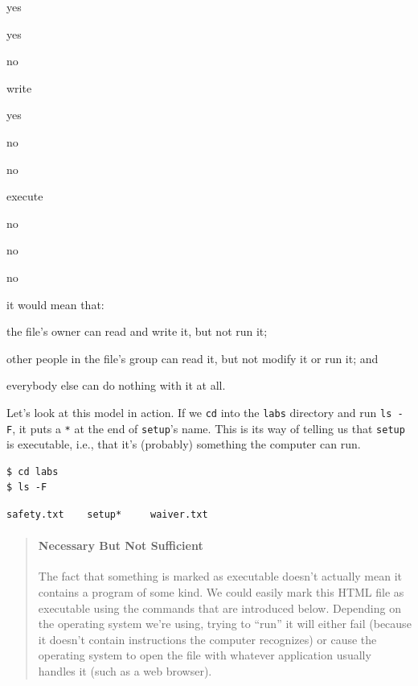 \documentclass{book}
\begin{document}
yes

yes

no

write

yes

no

no

execute

no

no

no

it would mean that:

\begin{swcitemize}
\item
  the file's owner can read and write it, but not run it;
\item
  other people in the file's group can read it, but not modify it or run
  it; and
\item
  everybody else can do nothing with it at all.
\end{swcitemize}

Let's look at this model in action. If we \texttt{cd} into the
\texttt{labs} directory and run \texttt{ls -F}, it puts a \texttt{*} at
the end of \texttt{setup}'s name. This is its way of telling us that
\texttt{setup} is executable, i.e., that it's (probably) something the
computer can run.

\begin{verbatim}
$ cd labs
$ ls -F
\end{verbatim}

\begin{verbatim}
safety.txt    setup*     waiver.txt
\end{verbatim}

\begin{quote}
\mbox{}\paragraph{Necessary But Not Sufficient}

The fact that something is marked as executable doesn't actually mean it
contains a program of some kind. We could easily mark this HTML file as
executable using the commands that are introduced below. Depending on
the operating system we're using, trying to ``run'' it will either fail
(because it doesn't contain instructions the computer recognizes) or
cause the operating system to open the file with whatever application
usually handles it (such as a web browser).
\end{quote}
\end{document}
